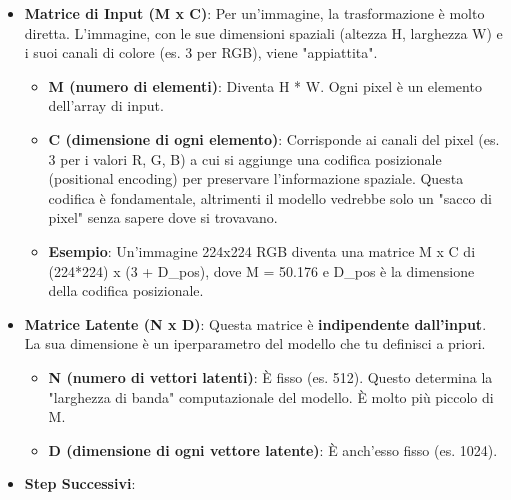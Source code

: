 \documentclass[
  11pt,
]{article}
\begin{document}
\begin{itemize}
\item
  \textbf{Matrice di Input (M x C)}: Per un'immagine, la
  trasformazione è molto diretta. L'immagine, con le sue
  dimensioni spaziali (altezza H, larghezza W) e i suoi canali di colore
  (es. 3 per RGB), viene "appiattita".

\begin{itemize}
  \item
    \textbf{M (numero di elementi)}: Diventa H * W. Ogni pixel è un
    elemento dell'array di input.
  \item
    \textbf{C (dimensione di ogni elemento)}: Corrisponde ai canali del
    pixel (es. 3 per i valori R, G, B) a cui si aggiunge una codifica
    posizionale (positional encoding) per preservare
    l'informazione spaziale. Questa codifica è
    fondamentale, altrimenti il modello vedrebbe solo un "sacco di
    pixel" senza sapere dove si trovavano.
  \item
    \textbf{Esempio}: Un'immagine 224x224 RGB diventa
    una matrice M x C di (224*224) x (3 + D\_pos), dove M = 50.176 e
    D\_pos è la dimensione della codifica posizionale.
  \end{itemize}
\item
  \textbf{Matrice Latente (N x D)}: Questa matrice è
  \textbf{indipendente dall'input}. La sua dimensione è
  un iperparametro del modello che tu definisci a priori.

\begin{itemize}
  \item
    \textbf{N (numero di vettori latenti)}: È fisso (es. 512). Questo
    determina la "larghezza di banda" computazionale del modello. È
    molto più piccolo di M.
  \item
    \textbf{D (dimensione di ogni vettore latente)}: È
    anch'esso fisso (es. 1024).
  \end{itemize}
\item
  \textbf{Step Successivi}:


\end{itemize}
\end{document}
